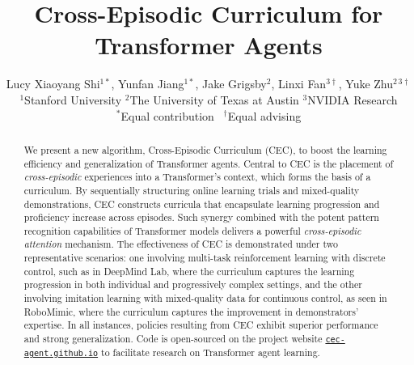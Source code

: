 \documentclass{article}
\title{Cross-Episodic Curriculum for Transformer Agents}
\author{
Lucy Xiaoyang Shi$^{1*}$, Yunfan Jiang$^{1*}$, Jake Grigsby$^2$, Linxi Fan$^{3 \dagger}$, Yuke Zhu$^{2\,3 \dagger}$\\
$^1$Stanford University \quad
$^2$The University of Texas at Austin \quad
$^3$NVIDIA Research\\
$^*$Equal contribution \, $^\dagger$Equal advising
}
\newcommand{\cec}[0]{\mbox{CEC}\xspace}
\newcommand{\webpage}[0]{\href{https://cec-agent.github.io/}{\texttt{cec-agent.github.io}}}
\begin{document}
\maketitle
\begin{abstract}
    We present a new algorithm, Cross-Episodic Curriculum (\cec), to boost the learning efficiency and generalization of Transformer agents.
Central to \cec is the placement of \textit{cross-episodic} experiences into a Transformer’s context, which forms the basis of a curriculum.
By sequentially structuring online learning trials and mixed-quality demonstrations,
\cec constructs curricula that encapsulate learning progression and proficiency increase across episodes.
Such synergy combined with the potent pattern recognition capabilities of Transformer models delivers a powerful \emph{cross-episodic attention} mechanism.
The effectiveness of \cec is demonstrated under two representative scenarios: one involving multi-task reinforcement learning with discrete control, such as in DeepMind Lab, where the curriculum captures the learning progression in both individual and progressively complex settings, and the other involving imitation learning with mixed-quality data for continuous control, as seen in RoboMimic, where the curriculum captures the improvement in demonstrators' expertise.
In all instances, policies resulting from \cec exhibit superior performance and strong generalization.
Code is open-sourced on the project website \webpage{} to facilitate research on Transformer agent learning.
\end{abstract}
\end{document}

